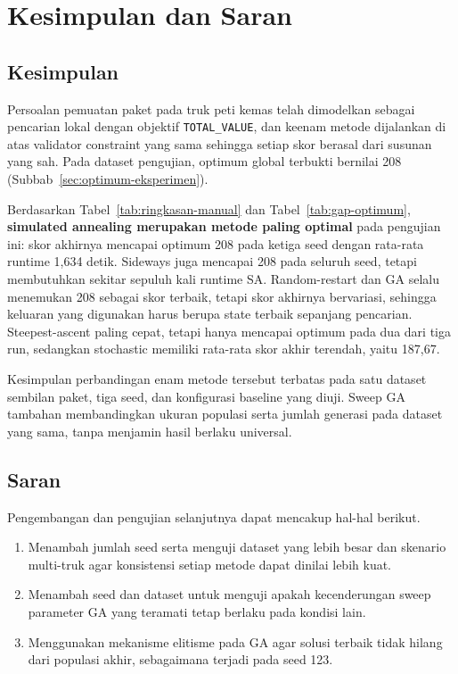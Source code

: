 \documentclass[12pt,a4paper]{article}
\begin{document}
\clearpage
\section{Kesimpulan dan Saran}
\subsection{Kesimpulan}
Persoalan pemuatan paket pada truk peti kemas telah dimodelkan sebagai pencarian lokal dengan objektif \texttt{TOTAL\_VALUE}, dan keenam metode dijalankan di atas validator constraint yang sama sehingga setiap skor berasal dari susunan yang sah. Pada dataset pengujian, optimum global terbukti bernilai 208 (Subbab~\ref{sec:optimum-eksperimen}).

Berdasarkan Tabel~\ref{tab:ringkasan-manual} dan Tabel~\ref{tab:gap-optimum}, \textbf{simulated annealing merupakan metode paling optimal} pada pengujian ini: skor akhirnya mencapai optimum 208 pada ketiga seed dengan rata-rata runtime 1,634 detik. Sideways juga mencapai 208 pada seluruh seed, tetapi membutuhkan sekitar sepuluh kali runtime SA. Random-restart dan GA selalu menemukan 208 sebagai skor terbaik, tetapi skor akhirnya bervariasi, sehingga keluaran yang digunakan harus berupa state terbaik sepanjang pencarian. Steepest-ascent paling cepat, tetapi hanya mencapai optimum pada dua dari tiga run, sedangkan stochastic memiliki rata-rata skor akhir terendah, yaitu 187,67.

Kesimpulan perbandingan enam metode tersebut terbatas pada satu dataset sembilan paket, tiga seed, dan konfigurasi baseline yang diuji. Sweep GA tambahan membandingkan ukuran populasi serta jumlah generasi pada dataset yang sama, tanpa menjamin hasil berlaku universal.

\subsection{Saran}
Pengembangan dan pengujian selanjutnya dapat mencakup hal-hal berikut.
\begin{enumerate}
    \setlength{\itemsep}{0pt}
    \setlength{\parsep}{0pt}
    \item Menambah jumlah seed serta menguji dataset yang lebih besar dan skenario multi-truk agar konsistensi setiap metode dapat dinilai lebih kuat.
    \item Menambah seed dan dataset untuk menguji apakah kecenderungan sweep parameter GA yang teramati tetap berlaku pada kondisi lain.
    \item Menggunakan mekanisme elitisme pada GA agar solusi terbaik tidak hilang dari populasi akhir, sebagaimana terjadi pada seed 123.
\end{enumerate}
\end{document}
